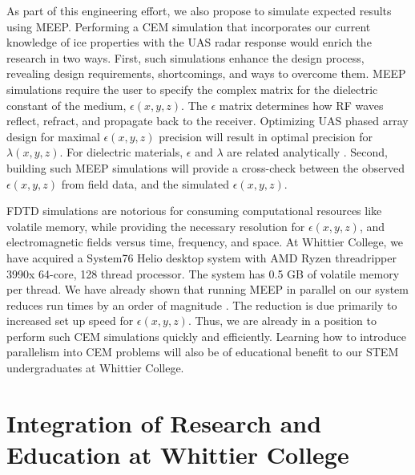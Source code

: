 \documentclass[../../main.tex]{subfiles}
\begin{document}
As part of this engineering effort, we also propose to simulate expected results using MEEP.  Performing a CEM simulation that incorporates our current knowledge of ice properties with the UAS radar response would enrich the research in two ways.  First, such simulations enhance the design process, revealing design requirements, shortcomings, and ways to overcome them.  MEEP simulations require the user to specify the complex matrix for the dielectric constant of the medium, $\epsilon(x,y,z)$.  The $\epsilon$ matrix  determines how RF waves reflect, refract, and propagate back to the receiver.  Optimizing UAS phased array design for maximal $\epsilon(x,y,z)$ precision will result in optimal precision for $\lambda(x,y,z)$.  For dielectric materials, $\epsilon$ and $\lambda$ are related analytically \cite{10.3189/2015jog14j214}.  Second, building such MEEP simulations will provide a cross-check between the observed $\epsilon(x,y,z)$ from field data, and the simulated $\epsilon(x,y,z)$. \\ \vspace{2.5mm}

FDTD simulations are notorious for consuming computational resources like volatile memory, while providing the necessary resolution for $\epsilon(x,y,z)$, and electromagnetic fields versus time, frequency, and space.  At Whittier College, we have acquired a System76 Helio desktop system with AMD Ryzen threadripper 3990x 64-core, 128 thread processor.  The system has 0.5 GB of volatile memory per thread.  We have already shown that running MEEP in parallel on our system reduces run times by an order of magnitude \cite{meepcon2022}.  The reduction is due primarily to increased set up speed for $\epsilon(x,y,z)$.  Thus, we are already in a position to perform such CEM simulations quickly and efficiently.  Learning how to introduce parallelism into CEM problems will also be of educational benefit to our STEM undergraduates at Whittier College.

\section{Integration of Research and Education at Whittier College}
\label{sec:int}
\end{document}

